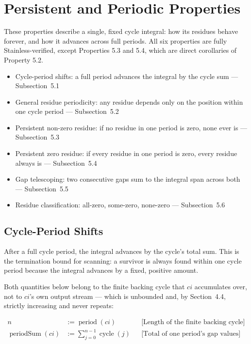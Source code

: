 \section{Persistent and Periodic Properties}

These properties describe a single, fixed cycle integral: how its residues
behave forever, and how it advances across full periods. All six
properties are fully Stainless-verified, except Properties 5.3 and 5.4,
which are direct corollaries of Property 5.2.

\begin{itemize}
  \item Cycle-period shifts: a full period advances the integral by the
    cycle sum --- Subsection~5.1
  \item General residue periodicity: any residue depends only on the
    position within one cycle period --- Subsection~5.2
  \item Persistent non-zero residue: if no residue in one period is zero,
    none ever is --- Subsection~5.3
  \item Persistent zero residue: if every residue in one period is zero,
    every residue always is --- Subsection~5.4
  \item Gap telescoping: two consecutive gaps sum to the integral span
    across both --- Subsection~5.5
  \item Residue classification: all-zero, some-zero, none-zero ---
    Subsection~5.6
\end{itemize}

\subsection{Cycle-Period Shifts}

After a full cycle period, the integral advances by the cycle's total sum.
This is the termination bound for scanning: a survivor is always found
within one cycle period because the integral advances by a fixed, positive
amount.

Both quantities below belong to the finite backing cycle that $ci$
accumulates over, not to $ci$'s own output stream --- which is unbounded
and, by Section~4.4, strictly increasing and never repeats:

\begin{equation*}
\begin{aligned}
n &:= \operatorname{period}(ci)
  &&\text{[Length of the finite backing cycle]} \\
\operatorname{periodSum}(ci) &:= \sum_{j=0}^{n-1} \operatorname{cycle}(j)
  &&\text{[Total of one period's gap values]}
\end{aligned}
\end{equation*}

